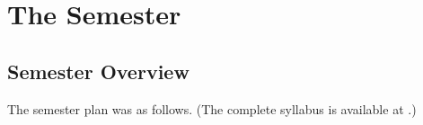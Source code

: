 \documentclass{article}
\begin{document}
\section{The Semester}

\begin{comment}
Three problems were evident before the semester began.

First, what is software design, anyway? The term is highly ambiguous.
Different experts hold radically different conceptions, from
James Reeves' view that ``the source code is the
design''\cite{reeves1992software} to IEEE~1016--2009, which specifies
12~``design viewpoints'', each with its own design entities, design
relationships, and design attributes, to be described in a design language
such as UML\cite{IEEE1016-2009}. The number of aspects or elements of software
design is mind-boggling, and each comes with its own opinionated camps and
controversies: high-level design, low-level design, system design, interface
design (which can mean user-interface design, interaction design,
communication protocols, or class method signatures, depending on who's
talking), database design, architectural design, GoF design patterns, ways of
organizing source code into subroutines, and more.

The sea of ambiguity and opinion surrounding ``software design''

Solution: I took the union of all theories of design, and announced on
the first day that the entire field of software design is a matter of
opinion (including this very statement). %


\end{comment}

\subsection{Semester Overview}

The semester plan was as follows. (The complete syllabus is available at
\cite{kovitz2025cs356syllabus}.)
\end{document}
